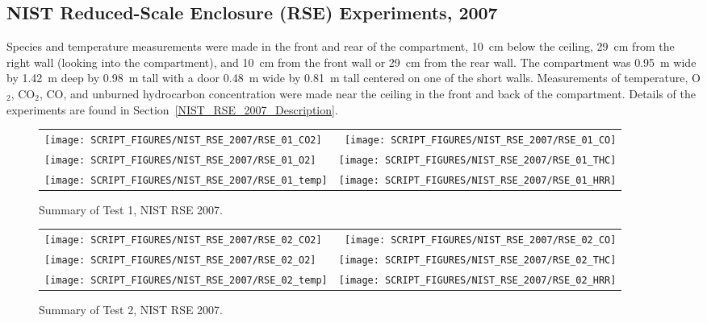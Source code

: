 \clearpage



\subsection{NIST Reduced-Scale Enclosure (RSE) Experiments, 2007}
\label{sec:NIST_RSE_2007}

Species and temperature measurements were made in the front and rear of the compartment, 10~cm below the ceiling, 29~cm from the right wall (looking into the compartment), and 10~cm from the front wall or 29~cm from the rear wall. The compartment was 0.95~m wide by 1.42~m deep by 0.98~m tall with a door 0.48~m wide by 0.81~m tall centered on one of the short walls.  Measurements of temperature, O$_2$, CO$_2$, CO, and unburned hydrocarbon concentration were made near the ceiling in the front and back of the compartment. Details of the experiments are found in Section~\ref{NIST_RSE_2007_Description}.

\begin{figure}[!ht]
\begin{tabular*}{\textwidth}{l@{\extracolsep{\fill}}r}
\texttt{[image: SCRIPT\_FIGURES/NIST\_RSE\_2007/RSE\_01\_CO2]} &
\texttt{[image: SCRIPT\_FIGURES/NIST\_RSE\_2007/RSE\_01\_CO]} \\
\texttt{[image: SCRIPT\_FIGURES/NIST\_RSE\_2007/RSE\_01\_O2]} &
\texttt{[image: SCRIPT\_FIGURES/NIST\_RSE\_2007/RSE\_01\_THC]} \\
\texttt{[image: SCRIPT\_FIGURES/NIST\_RSE\_2007/RSE\_01\_temp]} &
\texttt{[image: SCRIPT\_FIGURES/NIST\_RSE\_2007/RSE\_01\_HRR]}
\end{tabular*}
\caption[Summary of Test 1, NIST RSE 2007]{Summary of Test 1, NIST RSE 2007.}
\label{NIST_RSE_2007_1}
\end{figure}

\newpage

\begin{figure}[p]
\begin{tabular*}{\textwidth}{l@{\extracolsep{\fill}}r}
\texttt{[image: SCRIPT\_FIGURES/NIST\_RSE\_2007/RSE\_02\_CO2]} &
\texttt{[image: SCRIPT\_FIGURES/NIST\_RSE\_2007/RSE\_02\_CO]} \\
\texttt{[image: SCRIPT\_FIGURES/NIST\_RSE\_2007/RSE\_02\_O2]} &
\texttt{[image: SCRIPT\_FIGURES/NIST\_RSE\_2007/RSE\_02\_THC]} \\
\texttt{[image: SCRIPT\_FIGURES/NIST\_RSE\_2007/RSE\_02\_temp]} &
\texttt{[image: SCRIPT\_FIGURES/NIST\_RSE\_2007/RSE\_02\_HRR]}
\end{tabular*}
\caption[Summary of Test 2, NIST RSE 2007]{Summary of Test 2, NIST RSE 2007.}
\label{NIST_RSE_2007_2}
\end{figure}

